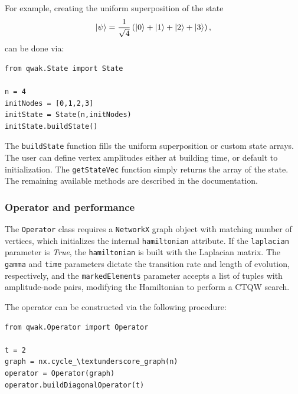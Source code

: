 \documentclass[../../dissertation.tex]{subfiles}
\begin{document}
For example, creating the uniform superposition of the state
\begin{equation}
    \ket{\psi} = \frac{1}{\sqrt{4}}\left( \ket{0} + \ket{1} +\ket{2} +\ket{3}\right),
\end{equation}
can be done via:

\begin{lstlisting}[style=code]
from qwak.State import State

n = 4
initNodes = [0,1,2,3]
initState = State(n,initNodes)
initState.buildState()
\end{lstlisting}

The \texttt{buildState} function fills the uniform superposition or custom
state arrays. The user can define vertex amplitudes either at
building time, or default to initialization. The \texttt{getStateVec} function
simply returns the array of the state. The remaining available methods are
described in the documentation. 


\subsubsection{Operator and performance}
The \texttt{Operator} class requires a \texttt{NetworkX} graph object with
matching number of vertices, which initializes the internal
\texttt{hamiltonian} attribute. If the \texttt{laplacian} parameter is
\textit{True}, the \texttt{hamiltonian} is built with the Laplacian matrix. The
\texttt{gamma} and \texttt{time} parameters dictate the transition rate and
length of evolution, respectively, and the \texttt{markedElements} parameter
accepts a list of tuples with amplitude-node pairs, modifying the Hamiltonian
to perform a CTQW search.\par

The operator can be constructed via the following procedure:
\begin{lstlisting}[style=code,escapeinside={__}]
from qwak.Operator import Operator 

t = 2
graph = nx.cycle_\textunderscore_graph(n)
operator = Operator(graph)
operator.buildDiagonalOperator(t)
\end{lstlisting}
\end{document}
